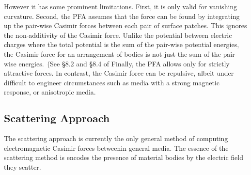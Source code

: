 However it has some prominent limitations.
First, it is only valid for vanishing curvature.
Second, the PFA assumes that the force can be found by integrating up
the pair-wise Casimir forces between each pair of surface patches.  This ignores the non-additivity
of the Casimir force.  Unlike the potential between electric charges where the total potential is
the sum of the pair-wise potential energies, the Casimir force for an arrangement
of bodies is not just the sum of the pair-wise energies.~(See \S{8.2} and \S{8.4} of \cite{Milonni1994}
Finally, the PFA allows only for strictly attractive forces.  
In contrast, the Casimir force can be repulsive, albeit under difficult to engineer circumstances 
such as media with a strong magnetic response, or anisotropic media.


\subsection{Scattering Approach}

The scattering approach is currently the only general method of computing 
electromagnetic Casimir forces betweenin general media.  The essence of the scattering method 
is encodes the presence of material bodies by the electric field they scatter.  

